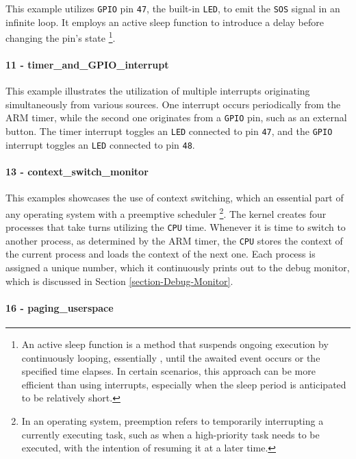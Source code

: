 \documentclass[english, ing, kiv, he, iso690numb, pdf]{fasthesis}
\begin{document}
	This example utilizes \texttt{GPIO} pin \texttt{47}, the built-in \texttt{LED}, to emit the \texttt{SOS} signal in an infinite loop. It employs an active sleep function to introduce a delay before changing the pin's state \footnote{An active sleep function is a method that suspends ongoing execution by continuously looping, essentially , until the awaited event occurs or the specified time elapses. In certain scenarios, this approach can be more efficient than using interrupts, especially when the sleep period is anticipated to be relatively short.}.
	
	\paragraph{11 - timer\_and\_GPIO\_interrupt}
	
	This example illustrates the utilization of multiple interrupts originating simultaneously from various sources. One interrupt occurs periodically from the ARM timer, while the second one originates from a \texttt{GPIO} pin, such as an external button. The timer interrupt toggles an \texttt{LED} connected to pin \texttt{47}, and the \texttt{GPIO} interrupt toggles an \texttt{LED} connected to pin \texttt{48}.
	
	\paragraph{13 - context\_switch\_monitor}
	
	This examples showcases the use of context switching, which an essential part of any operating system with a preemptive scheduler \footnote{In an operating system, preemption refers to temporarily interrupting a currently executing task, such as when a high-priority task needs to be executed, with the intention of resuming it at a later time.}. The kernel creates four processes that take turns utilizing the \texttt{CPU} time. Whenever it is time to switch to another process, as determined by the ARM timer, the \texttt{CPU} stores the context of the current process and loads the context of the next one. Each process is assigned a unique number, which it continuously prints out to the debug monitor, which is discussed in Section \ref{section-Debug-Monitor}.
	
	\paragraph{16 - paging\_userspace}
	
\end{document}
